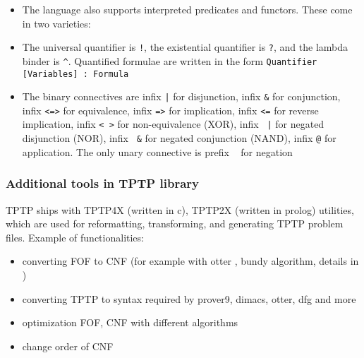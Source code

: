 \begin{itemize}
  \item The language also supports interpreted predicates and functors. These come in two varieties: 

  \item The universal quantifier is \texttt{!}, the existential quantifier is \texttt{?}, and the lambda binder is \texttt{^}. Quantified formulae are written in the form \texttt{Quantifier [Variables] :  Formula}

  \item The binary connectives are infix \texttt{|} for disjunction, infix \texttt{&} for conjunction, infix \texttt{<=>} for equivalence, infix \texttt{=>} for implication, infix \texttt{<=} for reverse implication, infix \texttt{<~>} for non-equivalence (XOR), infix \texttt{~|} for negated disjunction (NOR), infix	\texttt{~&} for negated conjunction (NAND), infix \texttt{@} for application. The only unary connective is prefix \texttt{~} for negation
\end{itemize}

\subsubsection{Additional tools in TPTP library}
\label{sub:AdditionalToolsInTPTPLibrary}

TPTP ships with \gls{TPTP4X} (written in c), \gls{TPTP2X} (written in prolog) utilities, which are used for reformatting, transforming, and generating TPTP problem files. Example of functionalities:

\begin{itemize}
  \item converting \gls{FOF} to \gls{CNF} (for example with otter \cite{McC-Otter-URL}, bundy \cite{Bun83} algorithm, details in \cite{SM96})
  \item converting TPTP to syntax required by prover9, dimacs, otter, dfg and more
  \item optimization \gls{FOF}, \gls{CNF} with different algorithms
  \item change order of \gls{CNF}
\end{itemize}

